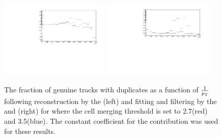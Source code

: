 \begin{figure}[tbp]
\centering
\includegraphics[width=0.47\textwidth]{figs/tk-upgrade/results-lowPtTracking/htFracDuplicatesVsInvPtTiltedGeometry_5000.pdf}
\includegraphics[width=0.47\textwidth]{figs/tk-upgrade/results-lowPtTracking/kfFracDuplicatesVsInvPtTiltedGeometry_5000.pdf}
\caption{The fraction of genuine tracks with duplicates as a function of $\frac{1}{p_{\mathrm{T}}}$ following reconstruction by the \HT (left) and fitting and filtering by the \KF and \DR (right) for where the \HT cell merging \pT threshold is set to 2.7\GeV (red) and 3.5\GeV (blue). 
The constant coefficient for the \MS contribution was used for these \KF results.
}
\label{fig:2GeVfracDups}
\end{figure}

